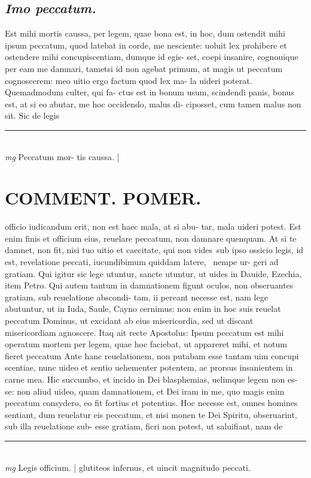\documentclass{article}
\begin{document}
\begin{pages}
\subsection*{\textit{Imo peccatum. }}\pstart Est mihi mortis caussa, per legem, quae bona est, in hoc, dum ostendit mihi ipsum peccatum, quod latebat in corde, me nesciente: uoluit lex prohibere et ostendere mihi concupiscentiam, dumque id egis- set, coepi insanire, cognouique per eam me damnari, tametsi id non agebat primum, at magis ut peccatum cognoscerem: meo uitio ergo factum quod lex ma- la uideri poterat. Quemadmodum culter, qui fa- ctus est in bonum usum, scindendi panis, bonus est, at si eo abutar, me hoc occidendo, malus di- ciposset, cum tamen malus non sit. Sic de legis  \pend
\vspace{0.5cm}\noindent
\vspace{0.2cm}\rule{1cm}{0.2pt}\\ 
\hspace{0.2cm}\textit{mg}
\footnotesize Peccatum mor- tis caussa.  
\normalsize| 
\section*{COMMENT. POMER.  }\pstart officio iudicandum erit, non est haec mala, at si abu- tar, mala uideri potest. Est enim finis et officium eius, reuelare peccatum, non damnare quenquam.  At si te damnet, non fit, nisi tuo uitio et caecitate, qui non vides sub ipso ossicio legis, id est, revelatione peccati, iucundibimum quiddam latere,  nempe ur- geri ad gratiam. Qui igitur sic lege utuntur, sancte utuntur, ut uides in Dauide, Ezechia, item Petro.  Qui autem tantum in damnationem figunt oculos, non obseruantes gratiam, sub reuelatione abscondi- tam, ii pereant necesse est, nam lege abutuntur, ut in Iuda, Saule, Cayno cernimus: non enim in hoc suis reuelat peccatum Dominus, ut excidant ab eius misericordia, sed ut discant misericordiam agnoscere.  Itaq ait recte Apostolus: Ipsum peccatum est mihi operatum mortem per legem, quae hoc faciebat, ut appareret mihi, et notum fieret peccatum Ante hanc reuelationem, non putabam esse tantam uim concupi scentiae, nunc uideo et sentio uehementer potentem, ac prorsus insanientem in carne mea. Hic succumbo, et incido in Dei blasphemias, uelimque legem non es- se: non aliud uideo, quam damnationem, et Dei iram in me, quo magis enim peccatum consydero, eo fit fortius et potentius. Hoc necesse est, omnes homines sentiant, dum reuelatur eis peccatum, et nisi monen te Dei Spiritu, obseruarint, sub illa reuelatione sub- esse gratiam, ficri non potest, ut saluifiant, nam de  \pend
\vspace{0.5cm}\noindent
\vspace{0.2cm}\rule{1cm}{0.2pt}\\ 
\hspace{0.2cm}\textit{mg}
\footnotesize Legis officium.  
\normalsize| 
\marginpar{[ p.K5 ]}
\marginpar{[ p.]}\pstart glutiteos infernus, et uincit magnitudo peccati.   \pend
{}
{}

\end{pages}
\end{document}

